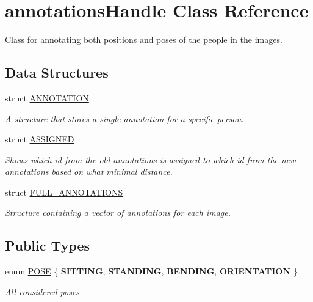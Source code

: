 \hypertarget{classannotationsHandle}{
\section{annotationsHandle Class Reference}
\label{classannotationsHandle}
}


Class for annotating both positions and poses of the people in the images.  


\subsection*{Data Structures}
\begin{DoxyCompactItemize}
\item 
struct \hyperlink{structannotationsHandle_1_1ANNOTATION}{ANNOTATION}
\begin{DoxyCompactList}\small\item\em A structure that stores a single annotation for a specific person. \item\end{DoxyCompactList}\item 
struct \hyperlink{structannotationsHandle_1_1ASSIGNED}{ASSIGNED}
\begin{DoxyCompactList}\small\item\em Shows which id from the old annotations is assigned to which id from the new annotations based on what minimal distance. \item\end{DoxyCompactList}\item 
struct \hyperlink{structannotationsHandle_1_1FULL__ANNOTATIONS}{FULL\_\-ANNOTATIONS}
\begin{DoxyCompactList}\small\item\em Structure containing a vector of annotations for each image. \item\end{DoxyCompactList}\end{DoxyCompactItemize}
\subsection*{Public Types}
\begin{DoxyCompactItemize}
\item 
enum \hyperlink{classannotationsHandle_a7a9e324ff6c85eeb2c2bd91b2b8cbdba}{POSE} \{ {\bfseries SITTING}, 
{\bfseries STANDING}, 
{\bfseries BENDING}, 
{\bfseries ORIENTATION}
 \}
\begin{DoxyCompactList}\small\item\em All considered poses. \item\end{DoxyCompactList}\end{DoxyCompactItemize}
